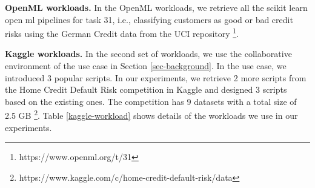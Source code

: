 \textbf{OpenML workloads.} In the OpenML workloads, we retrieve all the scikit learn open ml pipelines for task 31, i.e., classifying customers as good or bad credit risks using the German Credit data from the UCI repository \cite{Dua:2017}\footnote{https://www.openml.org/t/31}.
%

\textbf{Kaggle workloads.} In the second set of workloads, we use the collaborative environment of the use case in Section \ref{sec-background}.
In the use case, we introduced 3 popular scripts.
In our experiments, we retrieve 2 more scripts from the Home Credit Default Risk competition in Kaggle and designed 3 scripts based on the existing ones.
The competition has 9 datasets with a total size of 2.5 GB \footnote{https://www.kaggle.com/c/home-credit-default-risk/data}.
Table \ref{kaggle-workload} shows details of the workloads we use in our experiments.

